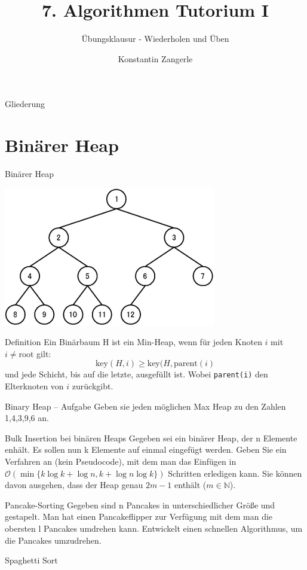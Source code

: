 \documentclass[18pt]{beamer}
\title[Algo I Tut]{7. Algorithmen Tutorium I}
\subtitle{Übungsklausur - Wiederholen und Üben}
\author[Zangerle]{Konstantin Zangerle}
\institute{Institut für Theoretische Informatik}
\newcommand{\N}{\mathbb{N}}
\newcommand{\Oh}{\mathcal{O}}
\begin{document}

\begin{frame}
\titlepage
\end{frame}

\begin{frame}{Gliederung}
 \tableofcontents
\end{frame}

\section{Binärer Heap}
\begin{frame}[fragile]{Binärer Heap}

\hspace{13em}
\includegraphics[scale=0.4]{Binary_heap_indexing}
 \begin{block}{Definition}
  Ein Binärbaum H ist ein Min-Heap, wenn für jeden Knoten $i$ mit $i \neq \text{root}$ gilt:
  $$\text{key}(H,i) \geq \text{key}(H,\text{parent}(i)$$
  und jede Schicht, bis auf die letzte, ausgefüllt ist.
  Wobei \verb|parent(i)| den Elterknoten von $i$ zurückgibt.
 \end{block}

\end{frame}

\begin{frame}{Binary Heap -- Aufgabe}
Geben sie jeden möglichen Max Heap zu den Zahlen 1,4,3,9,6 an.
\end{frame}

\begin{frame}{Bulk Insertion bei binären Heaps}
Gegeben sei ein binärer Heap, der n Elemente enhält. Es sollen nun k Elemente auf einmal
eingefügt werden. Geben Sie ein Verfahren an (kein Pseudocode), mit dem man das Einfügen in $\Oh(\min\{k \log k + \log n, k + \log n \log k \})$ Schritten erledigen kann.
Sie können davon ausgehen, dass der Heap genau $2m - 1$ enthält ($m \in \N$).
\end{frame}

\begin{frame}{Pancake-Sorting}
 Gegeben sind n Pancakes in unterschiedlicher Größe und gestapelt. Man hat einen Pancakeflipper zur Verfügung mit dem man
 die obersten l Pancakes umdrehen kann.
 Entwickelt einen schnellen Algorithmus, um die Pancakes umzudrehen.
\end{frame}

\begin{frame}{Spaghetti Sort}
 
\end{frame}
\end{document}
